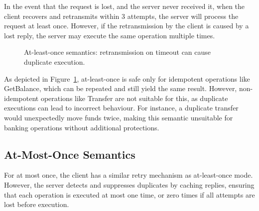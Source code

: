 \documentclass[9pt,a4paper]{article}
\begin{document}
In the event that the request is lost, and the server never received it, when the client recovers and retransmits within 3 attempts, the server will process the request at least once. However, if the retransmission by the client is caused by a lost reply, the server may execute the same operation multiple times.

\begin{figure}[H]
\centering
{}
\caption{At-least-once semantics: retransmission on timeout can cause duplicate execution.}
\label{fig:at-least-once-flow}
\end{figure}

As depicted in Figure~\ref{fig:at-least-once-flow}, at-least-once is safe only for idempotent operations like GetBalance, which can be repeated and still yield the same result. However, non-idempotent operations like Transfer are not suitable for this, as duplicate executions can lead to incorrect behaviour. For instance, a duplicate transfer would unexpectedly move funds twice, making this semantic unsuitable for banking operations without additional protections.

\subsection{At-Most-Once Semantics}

For at most once, the client has a similar retry mechanism as at-least-once mode. However, the server detects and suppresses duplicates by caching replies, ensuring that each operation is executed at most one time, or zero times if all attempts are lost before execution.
\end{document}
